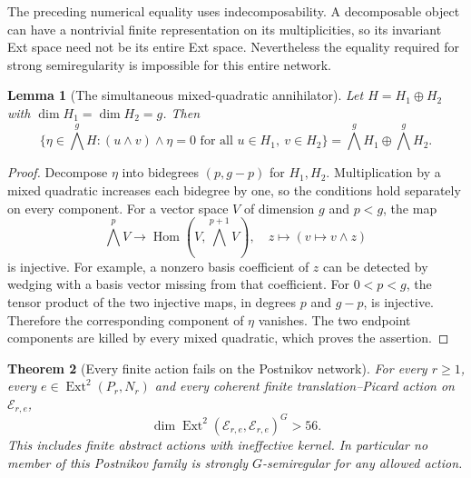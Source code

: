 \documentclass[11pt]{article}
\newtheorem{theorem}{Theorem}[section]
\newtheorem{lemma}[theorem]{Lemma}
\theoremstyle{definition}
\theoremstyle{remark}
\begin{document}
The preceding numerical equality uses indecomposability.  A
decomposable object can have a nontrivial finite representation
on its multiplicities, so its invariant Ext space need not be
its entire Ext space.  Nevertheless the equality required for
strong semiregularity is impossible for this entire network.

\begin{lemma}[The simultaneous mixed-quadratic annihilator]
\label{lem:mixed-quadratic-joint-annihilator}
Let $H=H_1\oplus H_2$ with $\dim H_1=\dim H_2=g$.  Then
\[
 \{\eta\in\textstyle\bigwedge^g H:
       (u\wedge v)\wedge\eta=0
       \text{ for all }u\in H_1,\ v\in H_2\}
 =\bigwedge^gH_1\oplus\bigwedge^gH_2.
\]
\end{lemma}

\begin{proof}
Decompose $\eta$ into bidegrees $(p,g-p)$ for $H_1,H_2$.
Multiplication by a mixed quadratic increases each bidegree by
one, so the conditions hold separately on every component.
For a vector space $V$ of dimension $g$ and $p<g$, the map
\[
 \bigwedge^p V\longrightarrow
 \operatorname{Hom}(V,\bigwedge^{p+1}V),
 \quad z\longmapsto(v\longmapsto v\wedge z)
\]
is injective.  For example, a nonzero basis coefficient of $z$
can be detected by wedging with a basis vector missing from
that coefficient.  For $0<p<g$, the tensor product of the two
injective maps, in degrees $p$ and $g-p$, is injective.
Therefore the corresponding component of $\eta$ vanishes.
The two endpoint components are killed by every mixed quadratic,
which proves the assertion.
\end{proof}

\begin{theorem}[Every finite action fails on the Postnikov network]
\label{thm:principal-postnikov-all-actions}
For every $r\geq1$, every $e\in\operatorname{Ext}^2(P_r,N_r)$ and every coherent
finite translation--Picard action on $\mathcal E_{r,e}$,
\[
 \dim\operatorname{Ext}^2(\mathcal E_{r,e},\mathcal E_{r,e})^G>56.
\]
This includes finite abstract actions with ineffective kernel.
In particular no member of this Postnikov family is strongly
$G$-semiregular for any allowed action.
\end{theorem}
\end{document}
